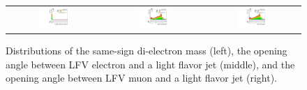 \begin{figure}[tbh!]
 \begin{center}
 \begin{tabular}{ccc}
  \includegraphics[width=0.325\textwidth]{figures/Appendix/SRMC/SSZmass}&
    \includegraphics[width=0.325\textwidth]{figures/Appendix/SRMC/JeDr}&
  \includegraphics[width=0.325\textwidth]{figures/Appendix/SRMC/JmuDr}\\
 \end{tabular}
 \caption{Distributions of the same-sign di-electron mass (left), the opening angle between LFV electron and a light flavor jet (middle), and the opening angle between LFV muon and a light flavor jet (right).}
 \label{fig:input_vali_5}
 \end{center}
\end{figure}

